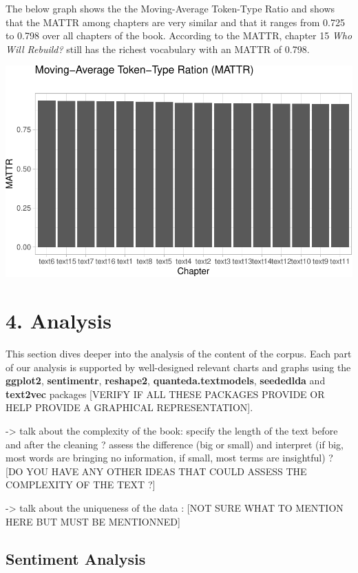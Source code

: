 \documentclass[
]{article}
\begin{document}
The below graph shows the the Moving-Average Token-Type Ratio and shows
that the MATTR among chapters are very similar and that it ranges from
0.725 to 0.798 over all chapters of the book. According to the MATTR,
chapter 15 \emph{Who Will Rebuild?} still has the richest vocabulary
with an MATTR of 0.798.

\begin{center}\includegraphics[width=0.7\linewidth]{report_files/figure-latex/MATTR plot-1} \end{center}

\hypertarget{analysis}{%
\section{4. Analysis}\label{analysis}}

This section dives deeper into the analysis of the content of the
corpus. Each part of our analysis is supported by well-designed relevant
charts and graphs using the \textbf{ggplot2}, \textbf{sentimentr},
\textbf{reshape2}, \textbf{quanteda.textmodels}, \textbf{seededlda} and
\textbf{text2vec} packages {[}VERIFY IF ALL THESE PACKAGES PROVIDE OR
HELP PROVIDE A GRAPHICAL REPRESENTATION{]}.

-\textgreater{} talk about the complexity of the book: specify the
length of the text before and after the cleaning ? assess the difference
(big or small) and interpret (if big, most words are bringing no
information, if small, most terms are insightful) ? {[}DO YOU HAVE ANY
OTHER IDEAS THAT COULD ASSESS THE COMPLEXITY OF THE TEXT ?{]}

-\textgreater{} talk about the uniqueness of the data : {[}NOT SURE WHAT
TO MENTION HERE BUT MUST BE MENTIONNED{]}

\hypertarget{sentiment-analysis}{%
\subsection{Sentiment Analysis}\label{sentiment-analysis}}
\end{document}
